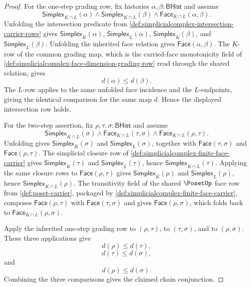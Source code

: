 \begin{proof}
For the one-step grading row, fix histories $\alpha,\beta:\mathsf{BHist}$ and assume
$$
\mathsf{Simplex}_{K\cap L}(\alpha)\land
\mathsf{Simplex}_{K\cap L}(\beta)\land
\mathsf{Face}_{K\cap L}(\alpha,\beta).
$$
Unfolding the intersection predicate from \autoref{def:simplicialcomplex-intersection-carrier-rows} gives $\mathsf{Simplex}_K(\alpha)$, $\mathsf{Simplex}_L(\alpha)$, $\mathsf{Simplex}_K(\beta)$, and $\mathsf{Simplex}_L(\beta)$. Unfolding the inherited face relation gives $\mathsf{Face}(\alpha,\beta)$. The $K$-row of the common grading map, which is the carried-face monotonicity field of \autoref{def:simplicialcomplex-face-dimension-grading-row} read through the shared relation, gives
$$
d(\alpha)\le d(\beta).
$$
The $L$-row applies to the same unfolded face incidence and the $L$-endpoints, giving the identical comparison for the same map $d$. Hence the displayed intersection row holds.

For the two-step assertion, fix $\rho,\tau,\sigma:\mathsf{BHist}$ and assume
$$
\mathsf{Simplex}_{K\cap L}(\sigma)
\land
\mathsf{Face}_{K\cap L}(\tau,\sigma)
\land
\mathsf{Face}_{K\cap L}(\rho,\tau).
$$
Unfolding gives $\mathsf{Simplex}_K(\sigma)$ and $\mathsf{Simplex}_L(\sigma)$, together with $\mathsf{Face}(\tau,\sigma)$ and $\mathsf{Face}(\rho,\tau)$. The simplicial closure row of \autoref{def:simplicialcomplex-finite-face-carrier} gives $\mathsf{Simplex}_K(\tau)$ and $\mathsf{Simplex}_L(\tau)$, hence $\mathsf{Simplex}_{K\cap L}(\tau)$. Applying the same closure rows to $\mathsf{Face}(\rho,\tau)$ gives $\mathsf{Simplex}_K(\rho)$ and $\mathsf{Simplex}_L(\rho)$, hence $\mathsf{Simplex}_{K\cap L}(\rho)$. The transitivity field of the shared $\PosetUp$ face row from \autoref{def:poset-carrier}, packaged by \autoref{def:simplicialcomplex-finite-face-carrier}, composes $\mathsf{Face}(\rho,\tau)$ with $\mathsf{Face}(\tau,\sigma)$ and gives $\mathsf{Face}(\rho,\sigma)$, which folds back to $\mathsf{Face}_{K\cap L}(\rho,\sigma)$.

Apply the inherited one-step grading row to $(\rho,\tau)$, to $(\tau,\sigma)$, and to $(\rho,\sigma)$. These three applications give
$$
d(\rho)\le d(\tau),
$$
$$
d(\tau)\le d(\sigma),
$$
and
$$
d(\rho)\le d(\sigma).
$$
Combining the three comparisons gives the claimed chain conjunction.
\end{proof}

